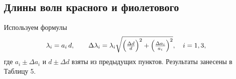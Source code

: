 \subsection{Длины волн красного и фиолетового}

Используем формулы
\[
	\lambda_i = a_i\,d,
	\qquad
	\Delta\lambda_i = \lambda_i
	\sqrt{\Bigl(\tfrac{\Delta d}{d}\Bigr)^2 + \Bigl(\tfrac{\Delta a_i}{a_i}\Bigr)^2},
	\quad i = 1,3,
\]
где \(a_i\pm\Delta a_i\) и \(d\pm\Delta d\) взяты из предыдущих пунктов.
Результаты занесены в Таблицу 5.
